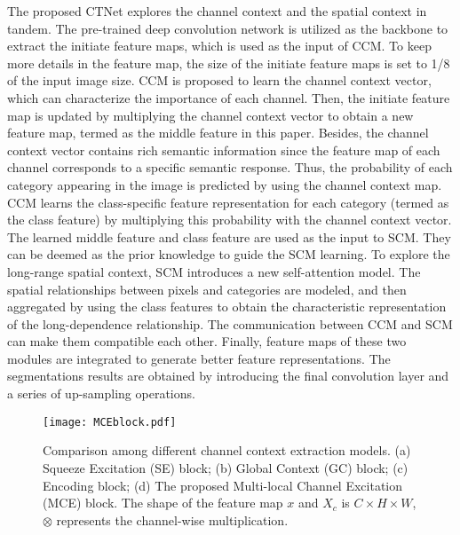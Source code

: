 \documentclass[10pt,journal,cspaper,compsoc]{IEEEtran}
\begin{document}
The proposed CTNet explores the channel context and the spatial context in tandem. The pre-trained deep convolution network is utilized as the backbone to extract the initiate feature maps, which is used as the input of CCM. To keep more details in the feature map, the size of the initiate feature maps is set to 1/8 of the input image size. CCM is proposed to learn the channel context vector, which can characterize the importance of each channel. Then, the initiate feature map is updated by multiplying the channel context vector to obtain a new feature map, termed as the middle feature in this paper. Besides, the channel context vector contains rich semantic information since the feature map of each channel corresponds to a specific semantic response. Thus, the probability of each category appearing in the image is predicted by using the channel context map. CCM learns the class-specific feature representation for each category (termed as the class feature) by multiplying this probability with the channel context vector. The learned middle feature and class feature are used as the input to SCM. They can be deemed as the prior knowledge to guide the SCM learning. To explore the long-range spatial context, SCM introduces a new self-attention model. The spatial relationships between pixels and categories are modeled, and then aggregated by using the class features to obtain the characteristic representation of the long-dependence relationship. The communication between CCM and SCM can make them compatible each other. Finally, feature maps of these two modules are integrated to generate better feature representations. The segmentations results are obtained by introducing the final convolution layer and a series of up-sampling operations.
	
\begin{figure}
\centering
\texttt{[image: MCEblock.pdf]}
\caption{Comparison among different channel context extraction models. (a) Squeeze Excitation (SE) block; (b) Global Context (GC) block; (c) Encoding block; (d) The proposed Multi-local Channel Excitation (MCE) block. The shape of the feature map $x$ and $X_{c}$ is $C\times H\times W$, $\otimes$ represents the channel-wise multiplication.}
\label{fig3}
\vspace {-4mm}
\end{figure}
	
\end{document}
